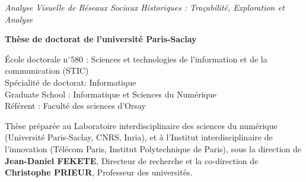 \documentclass[12pt,a4paper, twoside, headings=small]{book}
\begin{document}
\begin{titlepage}
        \normalsize
        \color{black}
        \Large{\textit{Analyse Visuelle de Réseaux Sociaux Historiques : Traçabilité, Exploration et Analyse}} \\

        \fontsize{8}{12}\selectfont

        \vspace{1.5cm}

        \normalsize
        \textbf{Thèse de doctorat de l'université Paris-Saclay} \\

        \vspace{6mm}

        \small École doctorale n$^{\circ}580$ : Sciences et technologies de l’information et de la communication (STIC)\\
        \small Spécialité de doctorat: Informatique\\
        \small Graduate School : Informatique et Sciences du Numérique\\
        \small Référent : Faculté des sciences d’Orsay \\
        \vspace{6mm}


        \footnotesize Thèse préparée au Laboratoire interdisciplinaire des sciences du numérique (Université Paris-Saclay, CNRS, Inria), et à l'Institut interdisciplinaire de l'innovation (Télécom Paris, Institut Polytechnique de Paris), sous la direction de \textbf{Jean-Daniel FEKETE}, Directeur de recherche et la co-direction de \textbf{Christophe PRIEUR}, Professeur des universités. \\


\end{titlepage}
\end{document}
